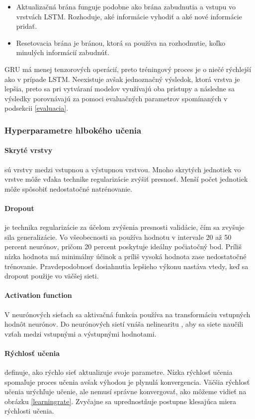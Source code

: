 \begin{itemize}
    \item Aktualizačná brána funguje podobne ako brána zabudnutia a vstupu vo vrstvách LSTM. Rozhoduje, aké informácie vyhodiť a aké nové informácie pridať.
    \item Resetovacia brána je bránou, ktorá sa používa na rozhodnutie, koľko minulých informácií zabudnúť.
\end{itemize}

GRU má menej tenzorových operácií, preto tréningový proces je o niečé rýchlejší ako v prípade LSTM. Neexistuje avšak jednoznačný výsledok, ktorá vrstva je lepšia, preto sa pri vytváraní modelov využívajú oba prístupy a následne sa výsledky porovnávajú za pomoci evaluačných parametrov spomínaných v podsekcii \ref{evaluacia}. 

\subsubsection{Hyperparametre hlbokého učenia}
\paragraph{Skryté vrstvy} sú vrstvy medzi vstupnou a výstupnou vrstvou. Mnoho skrytých jednotiek vo vrstve môže vďaka technike regularizácie zvýšiť presnosť. Menší počet jednotiek môže spôsobiť nedostatočné natrénovanie.

\paragraph{Dropout} je technika regularizácie za účelom zvýšenia presnosti validácie, čím sa zvyšuje sila generalizácie. Vo všeobecnosti sa používa hodnotu v intervale 20 až 50 percent neurónov, pričom 20 percent poskytuje ideálny počiatočný bod. Príliš nízka hodnota má minimálny účinok a príliš vysoká hodnota zase nedostatočné trénovanie. Pravdepodobnosť dosiahnutia lepšieho výkonu nastáva vtedy, keď sa dropout použije vo väčšej sieti.

\paragraph{Activation function}
V neurónových sieťach sa aktivačná funkcia používa na transformáciu vstupných hodnôt neurónov. Do neurónových sietí vnáša nelinearitu , aby sa siete naučili vzťah medzi vstupnými a výstupnými hodnotami.

\paragraph{Rýchlosť učenia} definuje, ako rýchlo sieť aktualizuje svoje parametre. Nízka rýchlosť učenia spomaľuje proces učenia avšak výhodou je plynulá konvergencia. Väčšia rýchlosť učenia urýchľuje učenie, ale nemusí správne konvergovať, ako môžeme vidieť na obrázku \ref{learningrate}. Zvyčajne sa uprednostňuje postupne klesajúca miera rýchlosti učenia.

